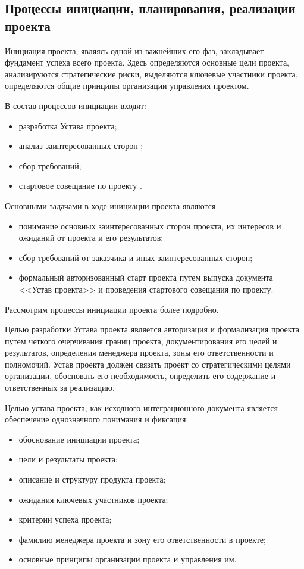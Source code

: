 \subsection{Процессы инициации, планирования, реализации проекта}

Инициация проекта, являясь одной из важнейших его фаз, закладывает фундамент успеха всего проекта.
Здесь определяются основные цели проекта, анализируются стратегические риски, выделяются ключевые участники проекта, определяются общие принципы организации управления проектом.

В состав процессов инициации входят:
\begin{itemize}
	\setlength\itemsep{0pt}
	\item разработка Устава проекта;
	\item анализ заинтересованных сторон ;
	\item сбор требований;
	\item стартовое совещание по проекту .
\end{itemize}

Основными задачами в ходе инициации проекта являются:
\begin{itemize}
	\setlength\itemsep{0pt}
	\item понимание основных заинтересованных сторон проекта, их интере­сов и ожиданий от проекта и его результатов;
	\item сбор требований от заказчика и иных заинтересованных сторон;
	\item формальный авторизованный старт проекта путем выпуска до­кумента <<Устав проекта>> и проведения стартового совещания по
	проекту.
\end{itemize}

Рассмотрим процессы инициации проекта более подробно.

Целью разработки Устава проекта является авторизация и формализа­ция проекта путем четкого очерчивания границ проекта, документиро­вания его целей и результатов, определения менеджера проекта, зоны его ответственности и полномочий.
Устав проекта должен связать проект со стратегическими целями организации, обосновать его необходимость, определить его содержа­ние и ответственных за реализацию.

Целью устава проекта, как исходного интеграционного документа является обеспечение однозначного понимания и фиксация:
{
\begin{itemize}
	\item обоснование инициации проекта;
	\item цели и результаты проекта;
	\item описание и структуру продукта проекта;
	\item ожидания ключевых участников проекта;
	\item критерии успеха проекта;
	\item фамилию менеджера проекта и зону его ответственности в проекте;
	\item основные принципы организации проекта и управления им.
\end{itemize}
}

